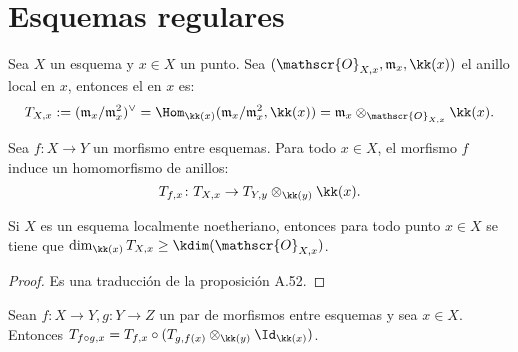 \section{Esquemas regulares}
\begin{mydef}
	Sea $X$ un esquema y $x \in X$ un punto. Sea $(\mathscr{O}_{X,x}, \mathfrak{m}_x , \kk(x))$
	el anillo local en $x$, entonces el  en $x$ es:
	\begin{equation*}
		T_{X,x} := (\mathfrak{m}_x /\mathfrak{m}^2_x )^\vee
		= \Hom_{\kk(x)}(\mathfrak{m}_x /\mathfrak{m}^2_x , \kk(x)) = \mathfrak{m}_x  \otimes_{\mathscr{O}_{X,x}} \kk(x).
	\end{equation*}
\end{mydef}
Sea $f \colon X \to Y$ un morfismo entre esquemas. Para todo $x \in X$, el morfismo
$f$ induce un homomorfismo de anillos:
\[
	T_{f,x} \colon T_{X,x} \to T_{Y,y} \otimes_{\kk(y)} \kk(x).
\]
\begin{prop}
	Si $X$ es un esquema localmente noetheriano, entonces
	para todo punto $x \in X$ se tiene que $\dim_{\kk(x)} T_{X,x} \ge \kdim(\mathscr{O}_{X,x} )$.
\end{prop}
\begin{proof}
	Es una traducción de la proposición A.52.
\end{proof}

\begin{prop}
	Sean $f \colon X \to Y, g \colon Y \to Z$ un par de morfismos
	entre esquemas y sea $x \in X$. Entonces $T_{f \circ g,x} = T_{f,x} \circ  (T_{g,f(x)} \otimes_{\kk(y)} \Id_{\kk(x)})$.
\end{prop}

